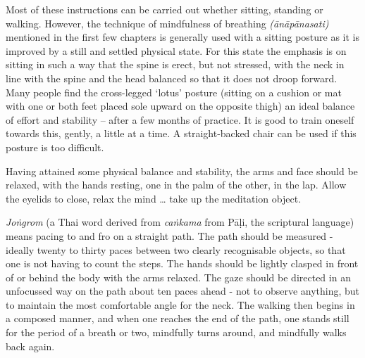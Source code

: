 
Most of these instructions can be carried out whether sitting, standing or walking. However, the technique of mindfulness of breathing \textit{(\=an\=ap\=anasati)} mentioned in the first few chapters is generally used with a sitting posture as it is improved by a still and settled physical state. For this state the emphasis is on sitting in such a way that the spine is erect, but not stressed, with the neck in line with the spine and the head balanced so that it does not droop forward. Many people find the cross-legged `lotus' posture (sitting on a cushion or mat with one or both feet placed sole upward on the opposite thigh) an ideal balance of effort and stability -- after a few months of practice. It is good to train oneself towards this, gently, a little at a time. A straight-backed chair can be used if this posture is too difficult. 

Having attained some physical balance and stability, the arms and face should be relaxed, with the hands resting, one in the palm of the other, in the lap. Allow the eyelids to close, relax the mind \ldots{} take up the meditation object.

\textit{Jo\.ngrom} (a Thai word derived from \textit{ca\.nkama} from P\=a\d{l}i, the scriptural language) means pacing to and fro on a straight path. The path should be measured - ideally twenty to thirty paces between two clearly recognisable objects, so that one is not having to count the steps. The hands should be lightly clasped in front of or behind the body with the arms relaxed. The gaze should be directed in an unfocussed way on the path about ten paces ahead - not to observe anything, but to maintain the most comfortable angle for the neck. The walking then begins in a composed manner, and when one reaches the end of the path, one stands still for the period of a breath or two, mindfully turns around, and mindfully walks back again.
